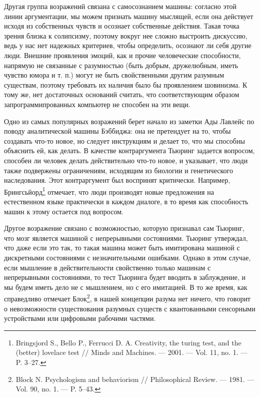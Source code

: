 \documentclass[12pt, specialist, subf, substylefile = spbu.rtx]{disser}
\begin{document}
Другая группа возражений связана с самосознанием машины: согласно этой линии аргументации, мы можем признать машину мыслящей, если она действует исходя из собственных чувств и осознает собственные действия. Такая точка зрения близка к солипсизму, поэтому вокруг нее сложно выстроить дискуссию, ведь у нас нет надежных критериев, чтобы определить, осознают ли себя другие люди. Внешние проявления эмоций, как и прочие человеческие способности, напрямую не связанные с разумностью (быть добрым, дружелюбным, иметь чувство юмора и т. п.) могут не быть свойственными другим разумным существам, поэтому требовать их наличия было бы проявлением шовинизма. К тому же, нет достаточных оснований считать, что соответствующим образом запрограммипрованных компьютер не способен на эти вещи.

Одно из самых популярных возражений берет начало из заметки Ады Лавлейс по поводу аналитической машины Бэббиджа: она не претендует на то, чтобы создавать что-то новое, но следует инструкциям и делает то, что мы способны объяснить ей, как делать. В качестве контраргумента Тьюринг задается вопросом, способен ли человек делать действительно что-то новое, и указывает, что люди также подвержены ограничениям, исходящим из биологии и генетического наследования. Этот контраргумент был воспринят критически. Например, Брингсьйорд\footnote{\cite{Bringsjord2001-BRICTT-3} Bringsjord S., Bello P., Ferrucci D. A. Creativity, the turing test, and the (better) lovelace test // Minds and Machines. — 2001. — Vol. 11, no. 1. — P. 3–27.} отмечает, что люди производят новые предложения на естественном языке практически в каждом диалоге, в то время как способность машин к этому остается под вопросом.

Другое возражение связано с возможностью, которую признавал сам Тьюринг, что мозг является машиной с непрерывными состояниями. Тьюринг утверждал, что даже если это так, то такая машина может быть имитирована машиной с дискретными состояниями с незначительными ошибками. Однако в этом случае, если мышление в действительности свойственно только машинам с непрерывными состояниями, то тест Тьюринга будет вводить в заблуждение, и мы будем иметь дело не с мышлением, но с его имитацией. В то же время, как справедливо отмечает Блок\footnote{\cite{Block1981-BLOPAB} Block N. Psychologism and behaviorism // Philosophical Review. — 1981. — Vol. 90, no. 1. — P. 5–43.}, в нашей концепции разума нет ничего, что говорит о невозможности существования разумных существ с квантованными сенсорными устройствами или цифровыми рабочими частями.
\end{document}
